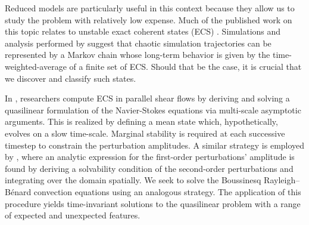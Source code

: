 \documentclass[reprint,amsmath,amssymb,aps]{revtex4-1}
\begin{document}
Reduced models are particularly useful in this context because they allow us to study the problem with relatively low expense. 
Much of the published work on this topic relates to unstable exact coherent states (ECS) \cite{Waleffe, Sondak, Wen, chini_cells}. 
Simulations and analysis performed by \cite{Yalniz, Cvitanovic} suggest that chaotic simulation trajectories can be represented by a Markov chain whose long-term behavior is given by the time-weighted-average of a finite set of ECS. Should that be the case, it is crucial that we discover and classify such states.

In \cite{Beaume_2015}, researchers compute ECS in parallel shear flows by deriving and solving a quasilinear formulation of the Navier-Stokes equations via multi-scale asymptotic arguments. 
This is realized by defining a mean state which, hypothetically, evolves on a slow time-scale. 
Marginal stability is required at each successive timestep to constrain the perturbation amplitudes. 
A similar strategy is employed by \cite{michel_chini_2019}, where an analytic expression for the first-order perturbations' amplitude is found by deriving a solvability condition of the second-order perturbations and integrating over the domain spatially. 
We seek to solve the Boussinesq Rayleigh–Bénard convection equations using an analogous strategy. 
The application of this procedure yields time-invariant solutions to the quasilinear problem with a range of expected and unexpected features. 
\end{document}
